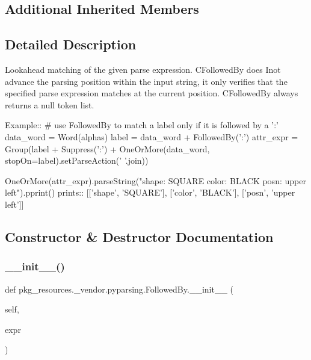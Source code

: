 \subsection*{Additional Inherited Members}


\subsection{Detailed Description}
\begin{DoxyVerb}Lookahead matching of the given parse expression.  C{FollowedBy}
does I{not} advance the parsing position within the input string, it only
verifies that the specified parse expression matches at the current
position.  C{FollowedBy} always returns a null token list.

Example::
    # use FollowedBy to match a label only if it is followed by a ':'
    data_word = Word(alphas)
    label = data_word + FollowedBy(':')
    attr_expr = Group(label + Suppress(':') + OneOrMore(data_word, stopOn=label).setParseAction(' '.join))
    
    OneOrMore(attr_expr).parseString("shape: SQUARE color: BLACK posn: upper left").pprint()
prints::
    [['shape', 'SQUARE'], ['color', 'BLACK'], ['posn', 'upper left']]
\end{DoxyVerb}
 

\subsection{Constructor \& Destructor Documentation}
\mbox{\label{classpkg__resources_1_1__vendor_1_1pyparsing_1_1FollowedBy_a53882c8e865062317a4af097f0d8aad6}} 
\subsubsection{\texorpdfstring{\+\_\+\+\_\+init\+\_\+\+\_\+()}{\_\_init\_\_()}}
{\footnotesize\ttfamily def pkg\+\_\+resources.\+\_\+vendor.\+pyparsing.\+Followed\+By.\+\_\+\+\_\+init\+\_\+\+\_\+ (\begin{DoxyParamCaption}\item[{}]{self,  }\item[{}]{expr }\end{DoxyParamCaption})}




